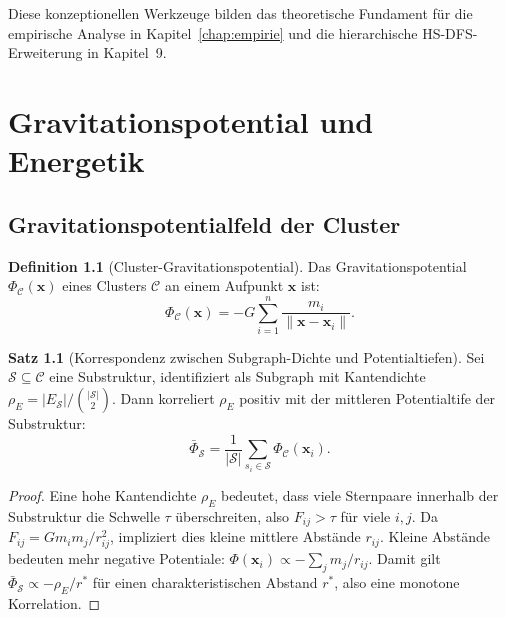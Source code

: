 ﻿\documentclass[a4paper,12pt]{report}
\theoremstyle{definition}
\newtheorem{definition}{Definition}
\newtheorem{satz}{Satz}
\begin{document}
Diese konzeptionellen Werkzeuge bilden das theoretische Fundament für die empirische Analyse in Kapitel~\ref{chap:empirie} und die hierarchische HS-DFS-Erweiterung in Kapitel~9.

\chapter{Gravitationspotential und Energetik}

\section{Gravitationspotentialfeld der Cluster}

\begin{definition}[Cluster-Gravitationspotential]
Das Gravitationspotential $\Phi_\mathcal{C}(\mathbf{x})$ eines Clusters $\mathcal{C}$ an einem Aufpunkt $\mathbf{x}$ ist:
\[
\Phi_\mathcal{C}(\mathbf{x}) = -G \sum_{i=1}^{n} \frac{m_i}{\|\mathbf{x} - \mathbf{x}_i\|}.
\]
\end{definition}

\begin{satz}[Korrespondenz zwischen Subgraph-Dichte und Potentialtiefen]
\label{satz:potdichte}
Sei $\mathcal{S} \subseteq \mathcal{C}$ eine Substruktur, identifiziert als Subgraph mit Kantendichte $\rho_E = |E_\mathcal{S}| / \binom{|\mathcal{S}|}{2}$. Dann korreliert $\rho_E$ positiv mit der mittleren Potentialtife der Substruktur:
\[
\bar{\Phi}_\mathcal{S} = \frac{1}{|\mathcal{S}|} \sum_{s_i \in \mathcal{S}} \Phi_\mathcal{C}(\mathbf{x}_i).
\]
\end{satz}

\begin{proof}
Eine hohe Kantendichte $\rho_E$ bedeutet, dass viele Sternpaare innerhalb der Substruktur die Schwelle $\tau$ überschreiten, also $F_{ij} > \tau$ für viele $i,j$. Da $F_{ij} = G m_i m_j / r_{ij}^2$, impliziert dies kleine mittlere Abstände $r_{ij}$. Kleine Abstände bedeuten mehr negative Potentiale: $\Phi(\mathbf{x}_i) \propto -\sum_j m_j / r_{ij}$. Damit gilt $\bar{\Phi}_\mathcal{S} \propto -\rho_E / r^*$ für einen charakteristischen Abstand $r^*$, also eine monotone Korrelation.
\end{proof}
\end{document}
